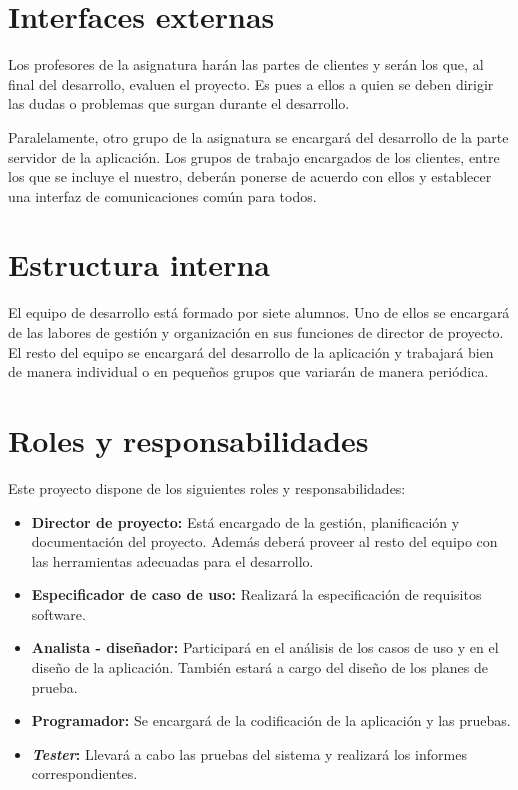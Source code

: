 \section{Interfaces externas}

Los profesores de la asignatura harán las partes de clientes y serán los que, al
final del desarrollo, evaluen el proyecto. Es pues a ellos a quien se deben
dirigir las dudas o problemas que surgan durante el desarrollo.

Paralelamente, otro grupo de la asignatura se encargará del desarrollo de la
parte servidor de la aplicación. Los grupos de trabajo encargados de los
clientes, entre los que se incluye el nuestro, deberán ponerse de acuerdo con
ellos y establecer una interfaz de comunicaciones común para todos.

\section{Estructura interna}

El equipo de desarrollo está formado por siete alumnos. Uno de ellos se
encargará de las labores de gestión y organización en sus funciones de director
de proyecto. El resto del equipo se encargará del desarrollo de la aplicación y
trabajará bien de manera individual o en pequeños grupos que variarán de manera
periódica.

\section{Roles y responsabilidades}

Este proyecto dispone de los siguientes roles y responsabilidades:
\begin{itemize}
\item \textbf{Director de proyecto:} Está encargado de la gestión,
planificación y documentación del proyecto. Además deberá proveer al resto del
equipo con las herramientas adecuadas para el desarrollo.
\item \textbf{Especificador de caso de uso:} Realizará la especificación de
requisitos software.
\item \textbf{Analista - diseñador:} Participará en el análisis de los casos de
uso y en el diseño de la aplicación. También estará a cargo del diseño de los
planes de prueba.
\item \textbf{Programador:} Se encargará de la codificación de la aplicación y
las pruebas.
\item \textbf{\textit{Tester}:} Llevará a cabo las pruebas del sistema y
realizará los informes correspondientes.
\end{itemize}
